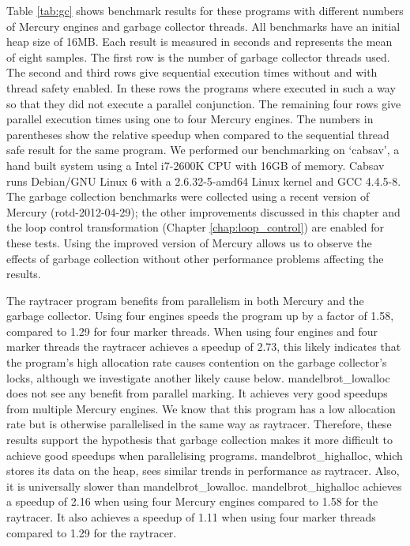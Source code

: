 

Table \ref{tab:gc} shows benchmark results for these programs
with different numbers of Mercury engines and garbage collector threads.
All benchmarks have an initial heap size of 16MB.
Each result is measured in seconds and represents the mean of eight samples.
The first row is the number of garbage collector threads used.
The second and third rows give sequential execution times
without and with thread safety enabled.
In these rows the programs where executed in such a way so that they did not
execute a parallel conjunction.
The remaining four rows give parallel execution times using one to four
Mercury engines.
The numbers in parentheses show the relative speedup when compared to the
sequential thread safe result for the same program.
\label{cabsav}
We performed our benchmarking on `cabsav',
a hand built system using a Intel i7-2600K CPU
with 16GB of memory.
Cabsav runs Debian/GNU Linux 6
with a 2.6.32-5-amd64 Linux kernel and GCC 4.4.5-8.
The garbage collection benchmarks were collected using a recent version of
Mercury (rotd-2012-04-29);
the other improvements discussed in this chapter and the loop control
transformation (Chapter \ref{chap:loop_control})
are enabled for these tests.
Using the improved version of Mercury allows us to observe the effects of
garbage collection without other performance problems affecting the results.

The raytracer program benefits from parallelism in both Mercury and the
garbage collector.
Using four engines speeds the program up by a factor of 1.58,
compared to 1.29 for four marker threads.
When using four engines and four marker threads the raytracer
achieves a speedup of 2.73,
this likely indicates that the program's high allocation rate causes
contention on the garbage collector's locks,
although we investigate another likely cause below.
mandelbrot\_lowalloc does not see any benefit from parallel marking.
It achieves very good speedups from multiple Mercury engines.
We know that this program has a low allocation rate
but is otherwise parallelised in the same way as raytracer.
Therefore,
these results support the hypothesis that garbage collection makes it more
difficult to achieve good speedups when parallelising programs.
mandelbrot\_highalloc, which stores its data on the heap,
sees similar trends in performance as raytracer.
Also, it is universally slower than mandelbrot\_lowalloc.
mandelbrot\_highalloc achieves a speedup of 2.16 when using four Mercury
engines compared to 1.58 for the raytracer.
It also achieves a speedup of 1.11 when using four marker threads compared
to 1.29 for the raytracer.

